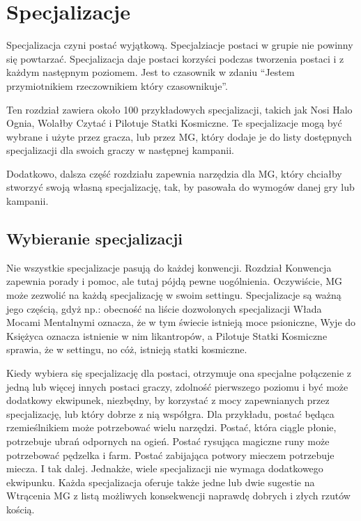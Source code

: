 \section{Specjalizacje}

Specjalizacja czyni postać wyjątkową. Specjalziacje postaci w grupie nie powinny się powtarzać. Specjalizacja daje postaci korzyści podczas tworzenia postaci i z każdym następnym poziomem. Jest to czasownik w zdaniu ``Jestem przymiotnikiem rzeczownikiem który czasownikuje''.

Ten rozdział zawiera około 100 przykładowych specjalizacji, takich jak Nosi Halo Ognia, Wolałby Czytać i Pilotuje Statki Kosmiczne. Te specjalizacje mogą być wybrane i użyte przez gracza, lub przez MG, który dodaje je do listy dostępnych specjalizacji dla swoich graczy w następnej kampanii. 

Dodatkowo, dalsza część rozdziału zapewnia narzędzia dla MG, który chciałby stworzyć swoją własną specjalizację, tak, by pasowała do wymogów danej gry lub kampanii.

\subsection{Wybieranie specjalizacji}

Nie wszystkie specjalizacje pasują do każdej konwencji. Rozdział Konwencja zapewnia porady i pomoc, ale tutaj pójdą pewne uogólnienia. Oczywiście, MG może zezwolić na każdą specjalizację w swoim settingu. Specjalizacje są ważną jego częścią, gdyż np.: obecność na liście dozwolonych specjalizacji Włada Mocami Mentalnymi oznacza, że w tym świecie istnieją moce psioniczne, Wyje do Księżyca oznacza istnienie w nim likantropów, a Pilotuje Statki Kosmiczne sprawia, że w settingu, no cóż, istnieją statki kosmiczne. 

Kiedy wybiera się specjalizację dla postaci, otrzymuje ona specjalne połączenie z jedną lub więcej innych postaci graczy, zdolność pierwszego poziomu i być może dodatkowy ekwipunek, niezbędny, by korzystać z mocy zapewnianych przez specjalizację, lub który dobrze z nią współgra. Dla przykładu, postać będąca rzemieślnikiem może potrzebować wielu narzędzi. Postać, która ciągle płonie, potrzebuje ubrań odpornych na ogień. Postać rysująca magiczne runy może potrzebować pędzelka i farm. Postać zabijająca potwory mieczem potrzebuje miecza. I tak dalej. Jednakże, wiele specjalizacji nie wymaga dodatkowego ekwipunku. Każda specjalizacja oferuje także jedne lub dwie sugestie na Wtrącenia MG z listą możliwych konsekwencji naprawdę dobrych i złych rzutów kością.  
 
